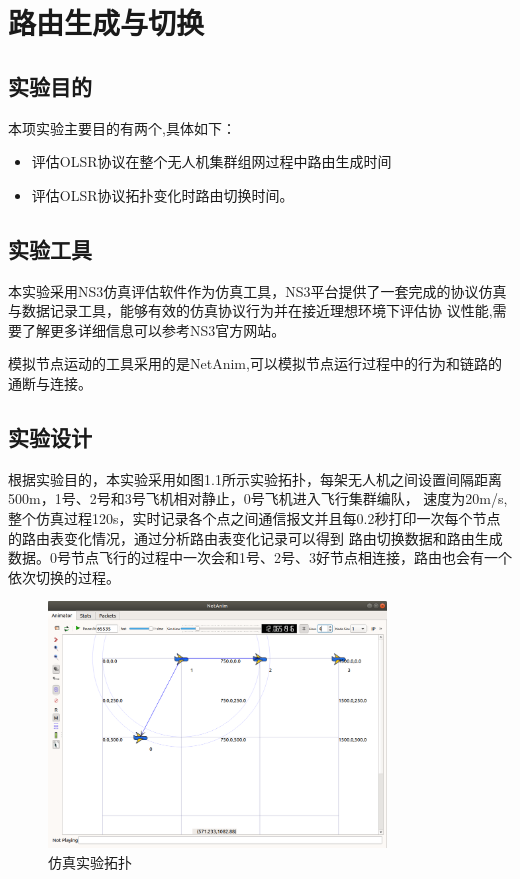 \documentclass[a4paper,12pt]{report}
\begin{document}
\tableofcontents %

\chapter{路由生成与切换}
\setcounter{page}{1}
\begin{spacing}{1.5}
\songti{}

\section{实验目的}
本项实验主要目的有两个,具体如下：
\begin{itemize}
\itemsep=3pt
\parskip=0pt
\item 评估OLSR协议在整个无人机集群组网过程中路由生成时间
\item 评估OLSR协议拓扑变化时路由切换时间。
\end{itemize}
\section{实验工具}
本实验采用NS3仿真评估软件作为仿真工具，NS3平台提供了一套完成的协议仿真与数据记录工具，能够有效的仿真协议行为并在接近理想环境下评估协
议性能,需要了解更多详细信息可以参考NS3官方网站\cite{NS3.web}。

模拟节点运动的工具采用的是NetAnim,可以模拟节点运行过程中的行为和链路的通断与连接。
\section{实验设计}
根据实验目的，本实验采用如图1.1所示实验拓扑，每架无人机之间设置间隔距离500m，1号、2号和3号飞机相对静止，0号飞机进入飞行集群编队，
速度为20m/s,整个仿真过程120s，实时记录各个点之间通信报文并且每0.2秒打印一次每个节点的路由表变化情况，通过分析路由表变化记录可以得到
路由切换数据和路由生成数据。0号节点飞行的过程中一次会和1号、2号、3好节点相连接，路由也会有一个依次切换的过程。
\begin{figure}[hbtp]
	\centering
	\includegraphics [width=0.8\textwidth]{figure//topo.png}
	\caption{仿真实验拓扑}\label{topo}
\end{figure}


\end{spacing}
\end{document}
